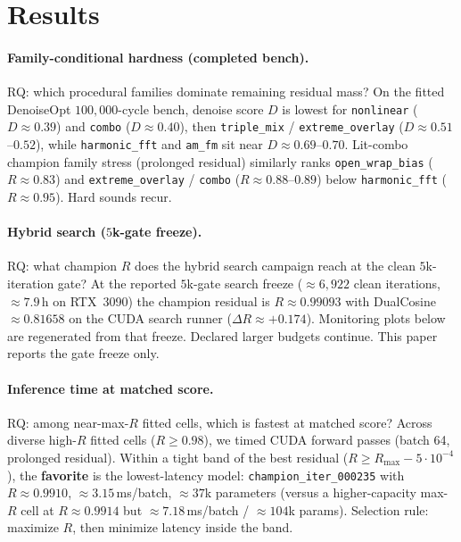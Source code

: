 \section{Results}
\label{sec:results}

\paragraph{Family-conditional hardness (completed bench).}
RQ: which procedural families dominate remaining residual mass?
On the fitted DenoiseOpt $100{,}000$-cycle bench, denoise score $D$ is lowest for \texttt{nonlinear} ($D\approx 0.39$) and \texttt{combo} ($D\approx 0.40$), then \texttt{triple\_mix} / \texttt{extreme\_overlay} ($D\approx 0.51$--$0.52$), while \texttt{harmonic\_fft} and \texttt{am\_fm} sit near $D\approx 0.69$--$0.70$.
Lit-combo champion family stress (prolonged residual) similarly ranks \texttt{open\_wrap\_bias} ($R\approx 0.83$) and \texttt{extreme\_overlay} / \texttt{combo} ($R\approx 0.88$--$0.89$) below \texttt{harmonic\_fft} ($R\approx 0.95$).
Hard sounds recur.

\paragraph{Hybrid search ($5$k-gate freeze).}
RQ: what champion $R$ does the hybrid search campaign reach at the clean $5$k-iteration gate?
At the reported $5$k-gate search freeze ($\approx 6{,}922$ clean iterations, $\approx 7.9$\,h on RTX~3090) the champion residual is $R\approx 0.99093$ with DualCosine $\approx 0.81658$ on the CUDA search runner ($\Delta R\approx{+}0.174$).
Monitoring plots below are regenerated from that freeze.
Declared larger budgets continue. This paper reports the gate freeze only.

\paragraph{Inference time at matched score.}
RQ: among near-max-$R$ fitted cells, which is fastest at matched score?
Across diverse high-$R$ fitted cells ($R\ge 0.98$), we timed CUDA forward passes (batch 64, prolonged residual).
Within a tight band of the best residual ($R \ge R_{\max}-5\cdot10^{-4}$), the \textbf{favorite} is the lowest-latency model:
\texttt{champion\_iter\_000235} with $R\approx 0.9910$, $\approx 3.15$\,ms/batch, $\approx 37$k parameters
(versus a higher-capacity max-$R$ cell at $R\approx 0.9914$ but $\approx 7.18$\,ms/batch / $\approx 104$k params).
Selection rule: maximize $R$, then minimize latency inside the band.

